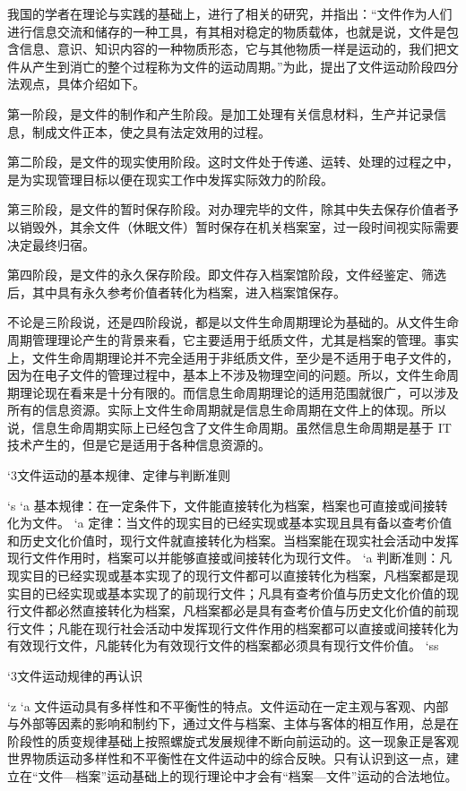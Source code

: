     我国的学者在理论与实践的基础上，进行了相关的研究，并指出：“文件作为人们进行信息交流和储存的一种工具，有其相对稳定的物质载体，也就是说，文件是包含信息、意识、知识内容的一种物质形态，它与其他物质一样是运动的，我们把文件从产生到消亡的整个过程称为文件的运动周期。”为此，提出了文件运动阶段四分法观点，具体介绍如下。

    第一阶段，是文件的制作和产生阶段。是加工处理有关信息材料，生产并记录信息，制成文件正本，使之具有法定效用的过程。

    第二阶段，是文件的现实使用阶段。这时文件处于传递、运转、处理的过程之中，是为实现管理目标以便在现实工作中发挥实际效力的阶段。

    第三阶段，是文件的暂时保存阶段。对办理完毕的文件，除其中失去保存价值者予以销毁外，其余文件（休眠文件）暂时保存在机关档案室，过一段时间视实际需要决定最终归宿。

    第四阶段，是文件的永久保存阶段。即文件存入档案馆阶段，文件经鉴定、筛选后，其中具有永久参考价值者转化为档案，进入档案馆保存。

    不论是三阶段说，还是四阶段说，都是以文件生命周期理论为基础的。从文件生命周期管理理论产生的背景来看，它主要适用于纸质文件，尤其是档案的管理。事实上，文件生命周期理论并不完全适用于非纸质文件，至少是不适用于电子文件的，因为在电子文件的管理过程中，基本上不涉及物理空间的问题。所以，文件生命周期理论现在看来是十分有限的。而信息生命周期理论的适用范围就很广，可以涉及所有的信息资源。实际上文件生命周期就是信息生命周期在文件上的体现。所以说，信息生命周期实际上已经包含了文件生命周期。虽然信息生命周期是基于 IT 技术产生的，但是它是适用于各种信息资源的。

    `3文件运动的基本规律、定律与判断准则

        `s
            `a 基本规律：在一定条件下，文件能直接转化为档案，档案也可直接或间接转化为文件。
            `a 定律：当文件的现实目的已经实现或基本实现且具有备以查考价值和历史文化价值时，现行文件就直接转化为档案。当档案能在现实社会活动中发挥现行文件作用时，档案可以并能够直接或间接转化为现行文件。
            `a 判断准则：凡现实目的已经实现或基本实现了的现行文件都可以直接转化为档案，凡档案都是现实目的已经实现或基本实现了的前现行文件；凡具有查考价值与历史文化价值的现行文件都必然直接转化为档案，凡档案都必是具有查考价值与历史文化价值的前现行文件；凡能在现行社会活动中发挥现行文件作用的档案都可以直接或间接转化为有效现行文件，凡能转化为有效现行文件的档案都必须具有现行文件价值。
        `ss

    `3文件运动规律的再认识

        `z
            `a 文件运动具有多样性和不平衡性的特点。文件运动在一定主观与客观、内部与外部等因素的影响和制约下，通过文件与档案、主体与客体的相互作用，总是在阶段性的质变规律基础上按照螺旋式发展规律不断向前运动的。这一现象正是客观世界物质运动多样性和不平衡性在文件运动中的综合反映。只有认识到这一点，建立在“文件—档案”运动基础上的现行理论中才会有“档案—文件”运动的合法地位。

